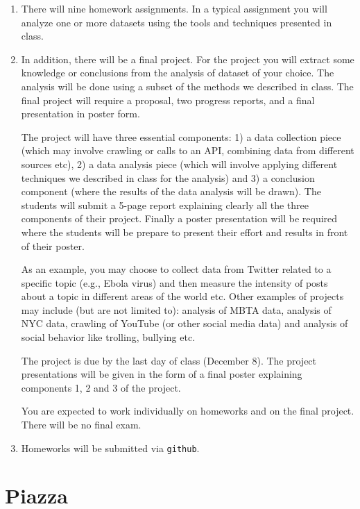 \documentclass[11pt]{article}
\begin{document}
\begin{enumerate}
\item There will nine homework assignments.  In a typical 
assignment you will 
analyze one or more datasets using the tools and techniques presented in
class.

\item In addition, there will be a final project.  For the project you
  will extract some
knowledge or conclusions from the analysis of dataset of your choice. The analysis
will be done using a subset of the methods we described in class.  The
final project will require a proposal, two progress reports, and a final
presentation in poster form.

The project will have three essential components: 1) a data collection
piece (which may involve crawling or calls to an API, combining data
from different sources etc), 2) a data analysis piece (which will
involve applying different techniques we described in class for the
analysis) and 3) a conclusion component (where the results of the data
analysis will be drawn).  The students will submit a 5-page report
explaining clearly all the three components of their project. Finally a
poster presentation will be required where the students will be prepare
to present their effort and results in front of their poster. 

As an example, you may choose to collect data from Twitter related
to a specific topic (e.g., Ebola virus) and then measure the intensity
of posts about a topic in different areas of the world etc.  Other
examples of projects may include (but are not limited to): analysis of
MBTA data, analysis of NYC data, crawling of YouTube (or other social
media data) and analysis of social behavior like trolling, bullying
etc. 

The project is due by the last day of class (December 8). The project presentations will be
given in the form of a final poster explaining components 1, 2 and 3 of
the project. 

You are expected to work individually on homeworks and on the final
project.  There will be no final exam.   

\item Homeworks will be submitted via \texttt{github}.
\end{enumerate}

\section*{Piazza}
\end{document}
